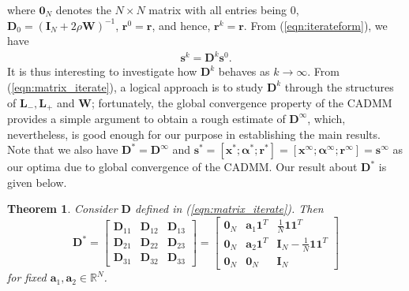 \documentclass[journal]{IEEEtran}
\newtheorem{theorem}{Theorem}
\newcommand{\nn}{\nonumber}
\begin{document}
where $\bm 0_N$ denotes the $N\times N$ matrix with all entries being $0$, $\bm D_0=(\bm I_N+2\rho \bm W)^{-1}$, $\bm r^0=\bm r$, and hence, $\bm r^k=\bm r$. From (\ref{eqn:iterateform}), we have 
\begin{equation}
\begin{aligned}
\bm s^{k}=\bm D^k\bm s^0.\nn
\end{aligned}
\end{equation}
It is thus interesting to investigate how $\bm D^k$ behaves as $k\to\infty$. From (\ref{eqn:matrix_iterate}), a logical approach is to study $\bm D^k$ through the structures of $\bm L_-,\bm L_+$ and $\bm W$; fortunately, the global convergence property of the CADMM provides a simple argument to obtain a rough estimate of $\bm D^\infty$, which, nevertheless, is good enough for our purpose in establishing the main results. Note that we also have $\bm D^*=\bm D^\infty$ and $\bm s^*=[\bm x^*;\bm \alpha^*;\bm r^*]=[\bm x^\infty;\bm\alpha^\infty;\bm r^\infty]=\bm s^\infty$ as our optima due to global convergence of the CADMM. Our result about $\bm D^*$ is given below.
\begin{theorem}
\label{thm:Dproperty}
Consider $\bm D$ defined in (\ref{eqn:matrix_iterate}). Then
$$\bm D^* =\begin{bmatrix} \bm D_{11} & \bm D_{12} &\bm D_{13}\\\bm D_{21} &\bm D_{22} & \bm D_{23}\\\bm D_{31} & \bm D_{32} &\bm D_{33}\end{bmatrix}= \begin{bmatrix} \bm 0_N & \bm a_1\bm 1^T&\frac{1}{N}\bm 1\bm 1^T \\ \bm 0_N & \bm a_2\bm 1^T &\bm I_N - \frac{1}{N}\bm 1\bm 1^T\\\bm 0_N & \bm 0_N &\bm I_N \end{bmatrix} $$
for fixed $\bm a_1, \bm a_2\in\mathbb{R}^N$.
\end{theorem}
\end{document}
